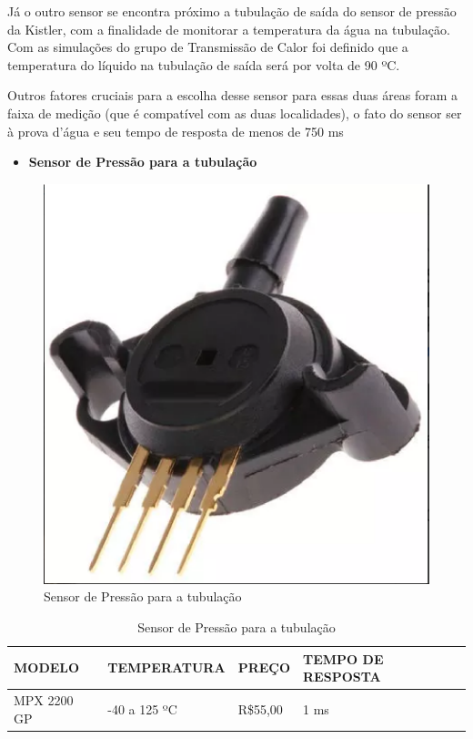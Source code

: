 Já o outro sensor se encontra próximo a tubulação de saída do sensor de pressão da Kistler, com a finalidade de monitorar a temperatura da água na tubulação. Com as simulações do grupo de Transmissão de Calor foi definido que a temperatura do líquido na tubulação de saída será por volta de 90 ºC.

Outros fatores cruciais para a escolha desse sensor para essas duas áreas foram a faixa de medição (que é compatível com as duas localidades), o fato do sensor ser à prova d’água e seu tempo de resposta de menos de 750 ms

\begin{itemize}
    \item \textbf{Sensor de Pressão para a tubulação}
\end{itemize}
\begin{figure}[!htb]                  
	\centering                          
	\includegraphics[scale=0.3]{figuras/Figura_5.eps}
	\caption{ Sensor de Pressão para a tubulação} \label{figsensor3}          
\end{figure}

\begin{table}[!h]
    \centering
    \begin{tabular}{|p{3cm}|p{5cm}|p{3cm}|p{3cm}|}
    \hline
    \textbf{MODELO} & \textbf{TEMPERATURA}    & \textbf{PREÇO} & \textbf{TEMPO DE RESPOSTA} \\ \hline
    MPX 2200 GP      & -40 a 125 ºC &  R\$55,00 & 1 ms  \\ \hline
    \end{tabular}
    \caption{Sensor de Pressão para a tubulação}
    \end{table}

